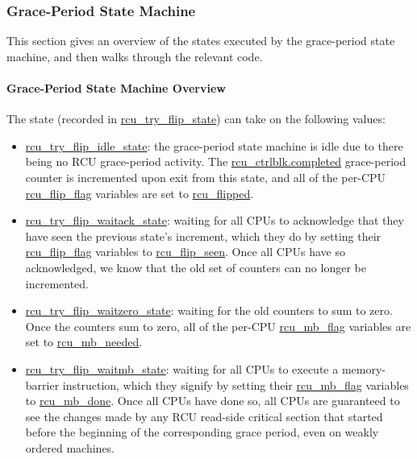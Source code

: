 \subsubsection{Grace-Period State Machine}
\label{app:rcuimpl:Grace-Period State Machine}

This section gives an overview of the states executed by the grace-period
state machine, and then walks through the relevant code.

\paragraph{Grace-Period State Machine Overview}
\label{app:rcuimpl:Grace-Period State Machine Overview}

The state (recorded in \url{rcu_try_flip_state})
can take on the following values:

\begin{itemize}
\item	\url{rcu_try_flip_idle_state}:  the grace-period state
	machine is idle due to there being no RCU grace-period activity.
	The \url{rcu_ctrlblk.completed} grace-period counter
	is incremented upon exit from this state, and all of the
	per-CPU \url{rcu_flip_flag} variables are set
	to \url{rcu_flipped}.
\item	\url{rcu_try_flip_waitack_state}:
	waiting for all CPUs to acknowledge that they have seen the
	previous state's increment, which they do by setting their
	\url{rcu_flip_flag} variables to \url{rcu_flip_seen}.
	Once all CPUs have so acknowledged, we know that the old
	set of counters can no longer be incremented.
\item	\url{rcu_try_flip_waitzero_state}:
	waiting for the old counters to sum to zero.
	Once the counters sum to zero, all of the per-CPU
	\url{rcu_mb_flag} variables are set to
	\url{rcu_mb_needed}.
\item	\url{rcu_try_flip_waitmb_state}:
	waiting for all CPUs to execute a memory-barrier instruction,
	which they signify by setting their \url{rcu_mb_flag}
	variables to \url{rcu_mb_done}.
	Once all CPUs have done so, all CPUs are guaranteed to see
	the changes made by any RCU read-side critical section that
	started before the beginning of the corresponding grace period,
	even on weakly ordered machines.
\end{itemize}

